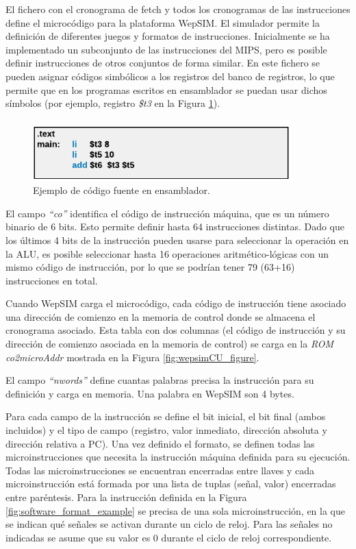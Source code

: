 \vspace{10mm}

El fichero con el cronograma de fetch y todos los cronogramas de las instrucciones define el microcódigo para la plataforma WepSIM. El simulador permite la definición de diferentes juegos y formatos de instrucciones. Inicialmente se ha implementado un subconjunto de las instrucciones del MIPS, pero es posible definir instrucciones de otros conjuntos de forma similar. En este fichero se pueden asignar códigos simbólicos a los registros del banco de registros, lo que permite que en los programas escritos en ensamblador se puedan usar dichos  símbolos (por ejemplo, registro \emph{\$t3} en la Figura \ref{fig:software_assembly_example}).

\begin{figure}[htbp]
 	\centering
 	\includegraphics[width=10cm]{figures/example_assembly}
 	\caption{Ejemplo de código fuente en ensamblador.}
	\label{fig:software_assembly_example}
\end{figure}

El campo \emph{``co''} identifica el código de instrucción máquina, que es un número binario de 6 bits. Esto permite definir hasta 64 instrucciones distintas. Dado que los últimos 4 bits de la instrucción pueden usarse para seleccionar la operación en la ALU, es posible seleccionar hasta 16 operaciones aritmético-lógicas con un mismo código de instrucción, por lo que se podrían tener 79 (63+16) instrucciones en total.

Cuando WepSIM carga el microcódigo, cada código de instrucción tiene asociado una dirección de comienzo en la memoria de control donde se almacena el cronograma asociado. Esta tabla con dos columnas (el código de instrucción y su dirección de comienzo asociada en la memoria de control) se carga en la \emph{ROM co2microAddr} mostrada en la Figura \ref{fig:wepsimCU_figure}.

El campo \emph{``nwords''} define cuantas palabras precisa la instrucción para su definición y carga en memoria. Una palabra en WepSIM son 4 bytes.

Para cada campo de la instrucción se define el bit inicial, el bit final (ambos incluidos) y el tipo de campo (registro, valor inmediato, dirección absoluta y dirección relativa a PC). Una vez definido el formato, se definen todas las microinstrucciones que necesita la instrucción máquina definida para su ejecución. Todas las microinstrucciones se encuentran encerradas entre llaves y cada microinstrucción está formada por una lista de tuplas (señal, valor) encerradas entre paréntesis. Para la instrucción definida en la Figura \ref{fig:software_format_example} se precisa de una sola microinstrucción, en la que se indican qué señales se activan durante un ciclo de reloj. Para las señales no indicadas se asume que su valor es 0 durante el ciclo de reloj correspondiente.

